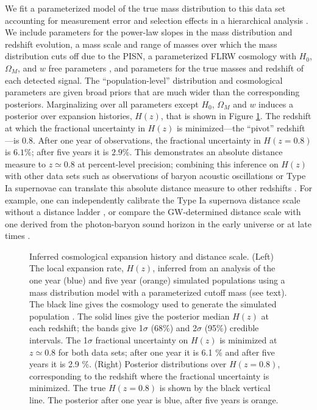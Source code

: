 \documentclass[modern]{aastex62}
\newcommand{\SigmaHPvtOneYear}{6.1 \%}
\newcommand{\SigmaHPvtFiveYear}{2.9 \%}
\newcommand{\zpivot}{0.8}
\begin{document}
We fit a parameterized model of the true mass distribution to this data set
accounting for measurement error and selection effects in a hierarchical
analysis \citep{Hogg2010,Mandel2010,Loredo2004,Mandel2019,Farr2019}.  We include
parameters for the power-law slopes in the mass distribution and redshift
evolution, a mass scale and range of masses over which the mass distribution
cuts off due to the \ac{PISN}, a parameterized FLRW cosmology with $H_0$,
$\Omega_M$, and $w$ free parameters \citep{Hogg1999}, and parameters for the
true masses and redshift of each detected signal.  The ``population-level''
distribution and cosmological parameters are given broad priors that are much
wider than the corresponding posteriors.  Marginalizing over all parameters
except $H_0$, $\Omega_M$ and $w$ induces a posterior over expansion histories,
$H(z)$, that is shown in Figure \ref{fig:Hz}.  The redshift at which the
fractional uncertainty in $H(z)$ is minimized---the ``pivot'' redshift---is
$\zpivot{}$.  After one year of observations, the fractional uncertainty in $H(z
= \zpivot)$ is $\SigmaHPvtOneYear{}$; after five years it is
$\SigmaHPvtFiveYear{}$.  This demonstrates an absolute distance measure to $z
\simeq \zpivot{}$ at percent-level precision; combining this inference on $H(z)$
with other data sets such as observations of baryon acoustic oscillations
\citep{BOSS2015} or Type Ia supernovae \citep{Scolnic2018} can translate this
absolute distance measure to other redshifts
\citep{BOSS2015,Cuesta2015,Feeney2019}. For example, one can independently
calibrate the Type Ia supernova distance scale without a distance ladder
\citep{Feeney2019,Scolnic2018}, or compare the \ac{GW}-determined distance scale
with one derived from the photon-baryon sound horizon
\citep{Cuesta2015,Aylor2019} in the early universe \citep{Planck2016} or at late
times \citep{BOSS2015}.

\begin{figure}
%
  \caption{\label{fig:Hz} Inferred cosmological expansion history and distance
  scale.  (Left) The local expansion rate, $H(z)$, inferred from an analysis of
  the one year (blue) and five year (orange) simulated populations using a mass
  distribution model with a parameterized cutoff mass (see text).  The black
  line gives the cosmology used to generate the simulated population \citep[TT,
  TE, EE + lowP + lensing + ext]{Planck2016}.  The solid lines give the
  posterior median $H(z)$ at each redshift; the bands give 1$\sigma$ (68\%) and
  2$\sigma$ (95\%) credible intervals.  The 1$\sigma$ fractional uncertainty on
  $H(z)$ is minimized at $z \simeq \zpivot{}$ for both data sets; after one year
  it is \SigmaHPvtOneYear{} and after five years it is \SigmaHPvtFiveYear{}.
  (Right) Posterior distributions over $H\left(z = \zpivot{}\right)$,
  corresponding to the redshift where the fractional uncertainty is minimized.
  The true $H\left( z = \zpivot{} \right)$ is shown by the black vertical line.
  The posterior after one year is blue, after five years is orange. }
%
\end{figure}
\end{document}
